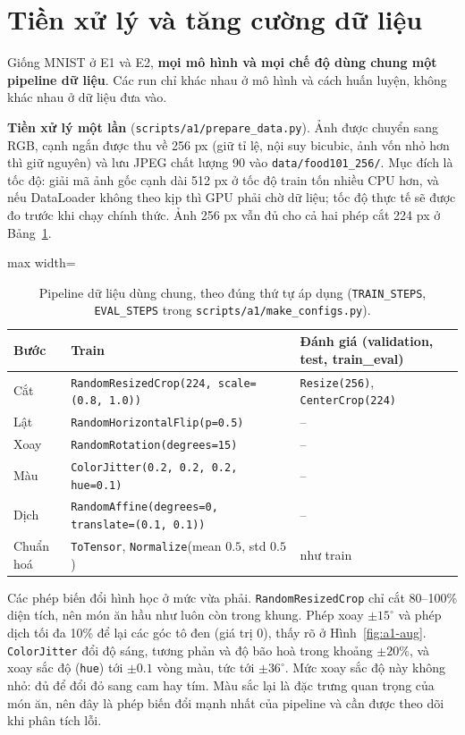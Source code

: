 \section{Tiền xử lý và tăng cường dữ liệu}\label{sec:a1-preproc}
Giống MNIST ở E1 và E2, \textbf{mọi mô hình và mọi chế độ dùng chung một pipeline dữ liệu}. Các run chỉ khác nhau ở mô hình và cách huấn luyện, không khác nhau ở dữ liệu đưa vào.

\textbf{Tiền xử lý một lần} (\texttt{scripts/a1/prepare\_data.py}). Ảnh được chuyển sang RGB, cạnh ngắn được thu về 256 px (giữ tỉ lệ, nội suy bicubic, ảnh vốn nhỏ hơn thì giữ nguyên) và lưu JPEG chất lượng 90 vào \texttt{data/food101\_256/}. Mục đích là tốc độ: giải mã ảnh gốc cạnh dài 512 px ở tốc độ train tốn nhiều CPU hơn, và nếu DataLoader không theo kịp thì GPU phải chờ dữ liệu; tốc độ thực tế sẽ được đo trước khi chạy chính thức. Ảnh 256 px vẫn đủ cho cả hai phép cắt 224 px ở Bảng~\ref{tab:a1-pipeline}.

\begin{table}[htbp]
\centering
\caption{Pipeline dữ liệu dùng chung, theo đúng thứ tự áp dụng (\texttt{TRAIN\_STEPS}, \texttt{EVAL\_STEPS} trong \texttt{scripts/a1/make\_configs.py}).}
\label{tab:a1-pipeline}
\small
\begin{adjustbox}{max width=\linewidth}
\begin{tabular}{lll}
\toprule
Bước & Train & Đánh giá (validation, test, train\_eval) \\
\midrule
Cắt & \texttt{RandomResizedCrop(224, scale=(0.8, 1.0))} & \texttt{Resize(256)}, \texttt{CenterCrop(224)} \\
Lật & \texttt{RandomHorizontalFlip(p=0.5)} & -- \\
Xoay & \texttt{RandomRotation(degrees=15)} & -- \\
Màu & \texttt{ColorJitter(0.2, 0.2, 0.2, hue=0.1)} & -- \\
Dịch & \texttt{RandomAffine(degrees=0, translate=(0.1, 0.1))} & -- \\
Chuẩn hoá & \texttt{ToTensor}, \texttt{Normalize}(mean \(0.5\), std \(0.5\)) & như train \\
\bottomrule
\end{tabular}
\end{adjustbox}
\end{table}

Các phép biến đổi hình học ở mức vừa phải. \texttt{RandomResizedCrop} chỉ cắt 80--100\% diện tích, nên món ăn hầu như luôn còn trong khung. Phép xoay \(\pm15^\circ\) và phép dịch tối đa 10\% để lại các góc tô đen (giá trị 0), thấy rõ ở Hình~\ref{fig:a1-aug}. \texttt{ColorJitter} đổi độ sáng, tương phản và độ bão hoà trong khoảng \(\pm20\%\), và xoay sắc độ (\texttt{hue}) tới \(\pm0.1\) vòng màu, tức tới \(\pm36^\circ\). Mức xoay sắc độ này không nhỏ: đủ để đổi đỏ sang cam hay tím. Màu sắc lại là đặc trưng quan trọng của món ăn, nên đây là phép biến đổi mạnh nhất của pipeline và cần được theo dõi khi phân tích lỗi.

